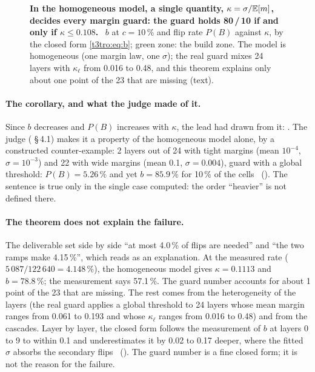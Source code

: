 \begin{figure}[tbp]
\centering
\GrapheTropicaleKappa
\caption[The theorem of the guard number]{\textbf{In the homogeneous model, a single quantity, $\kappa = \sigma/\mathbb{E}[m]$, decides every margin guard: the guard holds 80\,/\,10 if and only if $\kappa \le 0.108$.} \calc~$b$ at $c = 10\,\%$ and flip rate $P(B)$ against $\kappa$, by the closed form \eqref{t3tro:eq:b}; green zone: the build zone. The model is homogeneous (one margin law, one $\sigma$); the real guard mixes 24 layers with $\kappa_\ell$ from 0.016 to 0.48, and this theorem explains only about one point of the 23 that are missing (text). }
\label{fig:t3-trop-kappa}
\end{figure}

\paragraph{The corollary, and what the judge made of it.} Since $b$ decreases and $P(B)$ increases with $\kappa$, the lead had drawn from it: . The judge ( §\,4.1) makes it a property of the homogeneous model alone, by a constructed counter-example: 2 layers out of 24 with tight margins (mean $10^{-4}$, $\sigma = 10^{-3}$) and 22 with wide margins (mean 0.1, $\sigma = 0.004$), guard with a global threshold: $P(B) = 5.26\,\%$ and yet $b = 85.9\,\%$ for 10\,\% of the cells \calc~(). The sentence  is true only in the single case computed: the order ``heavier'' is not defined there.

\paragraph{The theorem does not explain the failure.} The deliverable set side by side ``at most 4.0\,\% of flips are needed'' and ``the two ramps make 4.15\,\%'', which reads as an explanation. At the measured rate ($5\,087/122\,640 = 4.148\,\%$), the homogeneous model gives $\kappa = 0.1113$ and $b = 78.8\,\%$; the measurement says 57.1\,\%. The guard number accounts for about 1 point of the 23 that are missing. The rest comes from the heterogeneity of the layers (the real guard applies a global threshold to 24 layers whose mean margin ranges from 0.061 to 0.193 and whose $\kappa_\ell$ ranges from 0.016 to 0.48) and from the cascades. Layer by layer, the closed form follows the measurement of $b$ at layers 0 to 9 to within 0.1 and underestimates it by 0.02 to 0.17 deeper, where the fitted $\sigma$ absorbs the secondary flips \mes~(). The guard number is a fine closed form; it is not the reason for the failure.


